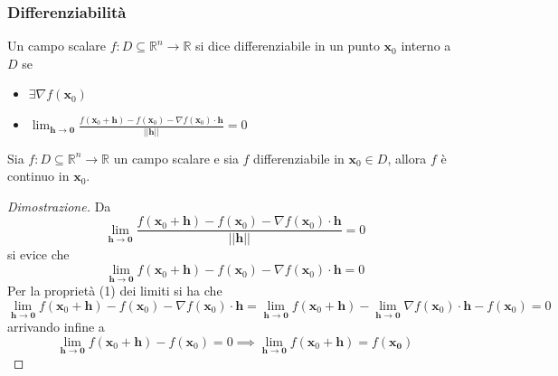             \subsubsection{Differenziabilità}
            \begin{definition}
                Un campo scalare $f: D \subseteq \mathbb{R}^{n} \rightarrow \mathbb{R}$ si dice differenziabile in un punto $\mathbf{x}_0$ interno a $D$ se
                \begin{itemize}
                    \item $\exists \nabla f (\mathbf{x}_0)$
                    \item $\displaystyle \lim_{\mathbf{h} \rightarrow \mathbf{0}} \frac{f(\mathbf{x}_0 + \mathbf{h}) - f(\mathbf{x}_0) - \nabla f(\mathbf{x}_0) \cdot \mathbf{h}}{|| \mathbf{h} ||} = 0$
                \end{itemize}
            \end{definition}

            \begin{theorem} 
                Sia $f: D \subseteq \mathbb{R}^{n} \rightarrow \mathbb{R}$ un campo scalare e sia $f$ differenziabile in $\mathbf{x}_0 \in D$, allora $f$ è continuo in $\mathbf{x}_0$.
            \end{theorem}

            \begin{proof} [Dimostrazione]
                Da
                \[
                    \lim_{\mathbf{h} \rightarrow \mathbf{0}} \frac{f(\mathbf{x}_0 + \mathbf{h}) - f(\mathbf{x}_0) - \nabla f(\mathbf{x}_0) \cdot \mathbf{h}}{|| \mathbf{h} ||} = 0
                \]
                si evice che
                \[
                    \lim_{\mathbf{h} \rightarrow \mathbf{0}} f(\mathbf{x}_0 + \mathbf{h}) - f(\mathbf{x}_0) - \nabla f(\mathbf{x}_0) \cdot \mathbf{h} = 0
                \]
                Per la proprietà (1) dei limiti si ha che
                \[
                    \lim_{\mathbf{h} \rightarrow \mathbf{0}} f(\mathbf{x}_0 + \mathbf{h}) - f(\mathbf{x}_0) - \nabla f(\mathbf{x}_0) \cdot \mathbf{h}  = \lim_{\mathbf{h} \rightarrow \mathbf{0}} f(\mathbf{x}_0 + \mathbf{h}) - \lim_{\mathbf{h} \rightarrow \mathbf{0}} \nabla f(\mathbf{x}_0) \cdot \mathbf{h} - f(\mathbf{x}_0)= 0
                \]
                arrivando infine a
                \[
                    \lim_{\mathbf{h} \rightarrow \mathbf{0}} f(\mathbf{x}_0 + \mathbf{h}) - f(\mathbf{x}_0) = 0 \implies \lim_{\mathbf{h} \rightarrow \mathbf{0}} f(\mathbf{x}_0 + \mathbf{h}) = f(\mathbf{x_0})
                \]
            \end{proof}

